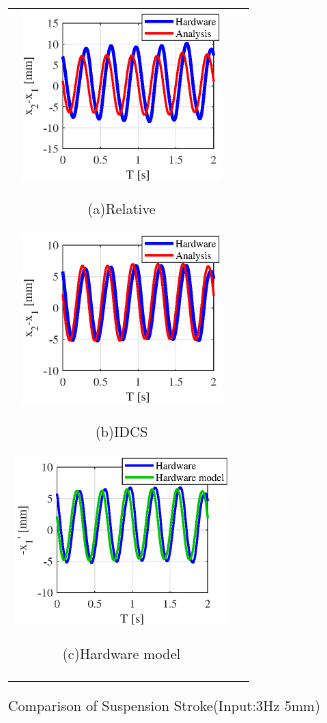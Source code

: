 \documentclass[a4paper,12pt]{article_vdlab_sotsuron}
\begin{document}
\begin{figure}[h]
  \begin{tabular}{cc}
  \begin{minipage}{0.33\hsize}
  \begin{center}
    \includegraphics[height=45mm]{figure/hils_rela_5_3.eps}
    \end{center}
    \begin{center}
    \ (a)Relative\
    \end{center}
  \end{minipage}
  \begin{minipage}{0.33\hsize}
     \begin{center}
      \includegraphics[height=45mm]{figure/hils_linear_sus_5_3.eps}
      \end{center}
      \begin{center}
      \ (b)IDCS\
    \end{center}
  \end{minipage}
  \begin{minipage}{0.33\hsize}
  \begin{center}
    \includegraphics[height=45mm]{figure/hils_linear_idcs_5_3.eps}
    \end{center}
    \begin{center}
    \ (c)Hardware model\
    \end{center}
  \end{minipage}
  \end{tabular}
\vspace*{2mm}
  \caption{Comparison of Suspension Stroke(Input:3Hz 5mm)}
    \label{fig:hils_5_3}
\end{figure}
\end{document}
